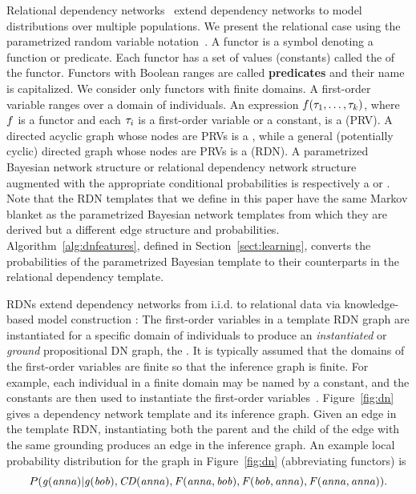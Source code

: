 \documentclass[runningheads,a4paper]{llncs}
\newcommand{\iid}{i.i.d.}
\begin{document}
Relational dependency networks~\cite{Neville2007} extend dependency networks to model distributions over multiple populations.
We  present the relational case using the parametrized random variable notation~\cite{Kimmig2014}.
A functor is a symbol denoting a function or predicate. Each functor has a set of values (constants) called the  of the functor. Functors with Boolean ranges are called \textbf{predicates} and their name is capitalized. We consider only functors with finite domains. A first-order variable ranges over a domain of individuals.  An expression $f(\tau_{1},\ldots,\tau_{k})$, where $f$ is a functor 
and each $\tau_{i}$ is a first-order variable or a constant, is a  (PRV).
A directed acyclic graph whose nodes are PRVs is
a , while a general (potentially cyclic) directed graph whose nodes are PRVs is a  (RDN). A parametrized Bayesian network structure or relational dependency network structure augmented with the appropriate conditional probabilities is  respectively a  or .  
 Note that the RDN templates that we define in this paper have the same Markov blanket as the parametrized Bayesian network templates from which they are derived but a different edge structure and probabilities. Algorithm~\ref{alg:dnfeatures}, defined in Section~\ref{sect:learning}, converts the probabilities of the parametrized Bayesian template to their counterparts in the relational dependency template. 

RDNs extend dependency networks from \iid{} to relational data via knowledge-based model construction \cite{Neville2007}:
The first-order variables in a template RDN graph are instantiated for a specific domain of individuals to produce an {\em  instantiated} or {\em ground} propositional DN graph, the . It is typically assumed that the domains of the first-order variables are finite so that the inference graph is finite. For example, each individual in a finite domain may be named by a constant, and the constants are then used to instantiate the first-order variables~\cite[Sec.2.2.5]{Kimmig2014}. Figure~\ref{fig:dn} gives a dependency network template and its  inference graph. Given an edge in the template RDN, instantiating both the parent and the child of the edge with the same grounding produces an edge in the inference graph. An example local probability distribution for the graph in Figure~\ref{fig:dn} (abbreviating functors) is
$$P(\it{g(anna)}|\it{g(bob)}, \it{CD(anna)}, \it{F(anna,bob)},\it{F(bob,anna)},\it{F(anna,anna)}).$$
\end{document}
